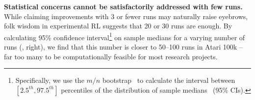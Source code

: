 \textbf{Statistical concerns cannot be satisfactorily addressed with few runs.}
While claiming improvements with 3 or fewer runs may naturally raise eyebrows, folk wisdom in experimental RL suggests that 20 or 30 runs are enough.
By calculating 95\% confidence interval\footnote{Specifically, we use the $m/n$ bootstrap~\citep{bickel2012resampling} to calculate the interval between $[2.5^{th}, 97.5^{th}]$ percentiles of the distribution of sample medians ~(95\% CIs).} on sample medians for a varying number of runs (, right), we find that this number is closer to 50--100 runs in Atari 100k -- far too many to be computationally feasible for most research projects. 


